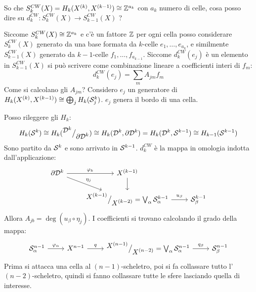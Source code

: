\begin{osservation}
  So che $ S_k^{CW}(X) = H_k(X^{(k)}, X^{(k-1)}) \cong \mathbb{Z}^{a_k} $ con $ a_k $ numero di celle,
  cosa posso dire su $ d_k^{CW} \colon S_k^{CW}(X) \to S_{k-1}^{CW}(X) $ ?

  Siccome $ S_k^{CW}(X) \cong \mathbb{Z}^{a_k} $ e c'è un fattore $ \mathbb{Z} $ per ogni cella
  posso considerare $ S_k^{CW}(X) $ generato da una base formata da
  $ k $-celle $ e_1, \dots, e_{a_k} $, e similmente $ S_{k-1}^{CW}(X) $ generato
  da $ k - 1 $-celle $ f_1, \dots, f_{a_{k-1}} $. Siccome $ d_k^{CW}(e_j) $ è un elemento in
  $ S_{k-1}^{CW}(X) $ si può scrivere come combinazione lineare a coefficienti interi di $ f_m $:
  \[
    d^{CW}_k (e_j) = \sum_m A_{jm}f_m
  \]
  Come si calcolano gli $ A_{jm} $?
  Considero $ e_j $ un generatore di $ H_k(X^{(k)}, X^{(k-1)}) \cong \bigoplus_j H_k(\mathcal{S}^{k}_j) $.
  $ e_j $ genera il bordo di una cella.

  Posso rileggere gli $ H_k $:
  \[
    H_k(\mathcal{S}^{k}) \cong H_k({^{\textstyle \mathcal{D}^{k}}\big/_{\textstyle \partial \mathcal{D}^{k}}}) \cong H_k(\mathcal{D}^{k}, \partial \mathcal{D}^{k}) =
    H_k(\mathcal{D}^{k}, \mathcal{S}^{k-1}) \cong H_{k-1}(\mathcal{S}^{k-1})
  \]
  Sono partito da $ \mathcal{S}^{k} $ e sono arrivato in $ \mathcal{S}^{k-1} $.
  $ d_k^{CW} $ è la mappa in omologia indotta dall'applicazione:
  \[
    \begin{tikzcd}
      \partial \Disk{k} \rar{\phi_k} \arrow{dr}{\eta_j} & X^{(k-1)} \dar & {}\\
      {} & \quot{X^{(k-1)}}{X^{(k-2)}} = \bigvee_\alpha \Sph{k-1}_\alpha \rar{u_\beta} & \Sph{k-1}_\beta
    \end{tikzcd}
  \]
  Allora $ A_{jb} = \deg{(u_\beta \circ \eta_j)} $.
  I coefficienti si trovano calcolando il grado della mappa:
  \[
    \begin{tikzcd}
      \Sph{n-1}_\alpha \rar{\phi_\alpha} & X^{n-1} \rar{q} & \quot{X^{(n-1)}}{X^{(n-2)}} = \bigvee_\alpha \Sph{n-1}_\alpha  \rar{q_\beta} & \Sph{n-1}_\beta
    \end{tikzcd}
  \]
  Prima si attacca una cella al $ (n-1) $-scheletro, poi si fa collassare tutto
  l'$ (n-2) $-scheletro, quindi si fanno collassare tutte le sfere lasciando
  quella di interesse.
\end{osservation}


